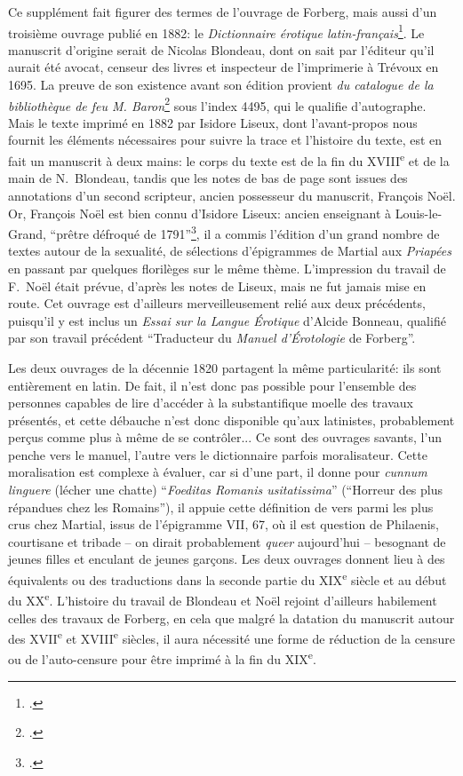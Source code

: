 Ce supplément fait figurer des termes de l'ouvrage de Forberg, mais aussi d'un troisième ouvrage publié en 1882: le \textit{Dictionnaire érotique latin-français}\footcite{blondeau_dictionnaire_1885}. Le manuscrit d'origine serait de Nicolas Blondeau, dont on sait par l'éditeur qu'il aurait été avocat, censeur des livres et inspecteur de l'imprimerie à Trévoux en 1695. La preuve de son existence avant son édition provient \textit{du catalogue de la bibliothèque de feu M. Baron}\footcite[Chap. \textit{Belles-Lettres}, p.~2]{noauthor_catalogue_1788} sous l'index 4495, qui le qualifie d'autographe. Mais le texte imprimé en 1882 par Isidore Liseux, dont l'avant-propos nous fournit les éléments nécessaires pour suivre la trace et l'histoire du texte, est en fait un manuscrit à deux mains: le corps du texte est de la fin du XVIII\textsuperscript{e} et de la main de N.~Blondeau, tandis que les notes de bas de page sont issues des annotations d'un second scripteur, ancien possesseur du manuscrit, François Noël. Or, François Noël est bien connu d'Isidore Liseux: ancien enseignant à Louis-le-Grand, \enquote{prêtre défroqué de 1791}\footcite[p.~XVI]{blondeau_dictionnaire_1885}, il a commis l'édition d'un grand nombre de textes autour de la sexualité, de sélections d'épigrammes de Martial aux \textit{Priapées} en passant par quelques florilèges sur le même thème. L'impression du travail de F.~Noël était prévue, d'après les notes de Liseux, mais ne fut jamais mise en route. Cet ouvrage est d'ailleurs merveilleusement relié aux deux précédents, puisqu'il y est inclus un \textit{Essai sur la Langue Érotique} d'Alcide Bonneau, qualifié par son travail précédent \enquote{Traducteur du \textit{Manuel d'Érotologie} de Forberg}.


Les deux ouvrages de la décennie 1820 partagent la même particularité: ils sont entièrement en latin. De fait, il n'est donc pas possible pour l'ensemble des personnes capables de lire d'accéder à la substantifique moelle des travaux présentés, et cette débauche n'est donc disponible qu'aux latinistes, probablement perçus comme plus à même de se contrôler... Ce sont des ouvrages savants, l'un penche vers le manuel, l'autre vers le dictionnaire parfois moralisateur. Cette moralisation est complexe à évaluer, car si d'une part, il donne pour \textit{cunnum linguere} (lécher une chatte) \enquote{\textit{Foeditas Romanis usitatissima}} (\enquote{Horreur des plus répandues chez les Romains}), il appuie cette définition de vers parmi les plus crus chez Martial, issus de l'épigramme VII, 67, où il est question de Philaenis, courtisane et tribade -- on dirait probablement \textit{queer} aujourd'hui -- besognant de jeunes filles et enculant de jeunes garçons. Les deux ouvrages donnent lieu à des équivalents ou des traductions dans la seconde partie du XIX\textsuperscript{e} siècle et au début du XX\textsuperscript{e}. L'histoire du travail de Blondeau et Noël rejoint d'ailleurs habilement celles des travaux de Forberg, en cela que malgré la datation du manuscrit autour des  XVII\textsuperscript{e} et XVIII\textsuperscript{e} siècles, il aura nécessité une forme de réduction de la censure ou de l'auto-censure pour être imprimé à la fin du XIX\textsuperscript{e}.


